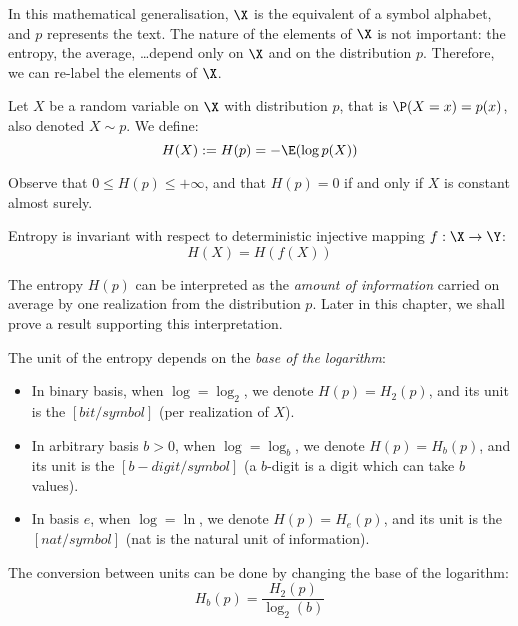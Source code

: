 \documentclass[toc]{../cs-classes/cs-classes}
\begin{document}
\begin{remark}
    In this mathematical generalisation, $\X$ is the equivalent of a symbol alphabet, and $p$ represents the text. The nature of the elements of $\X$ is not important: the entropy, the average, \dots depend only on $\X$ and on the distribution $p$. Therefore, we can re-label the elements of $\X$.
\end{remark}

\begin{definition}
    Let $X$ be a random variable on $\X$ with distribution $p$, that is $\P(X=x) = p(x)$, also denoted $X \sim p$. We define:
    \begin{equation}
        H(X) := H(p) = -\E(\log p(X))
    \end{equation}
\end{definition}

Observe that $0\leq H(p) \leq +\infty$, and that $H(p)=0$ if and only if $X$ is constant almost surely.

\begin{property}
    Entropy is invariant with respect to deterministic injective mapping $f: \X \to \Y$:
    \begin{equation*}
        H(X) = H(f(X))
    \end{equation*}
\end{property}

The entropy $H(p)$ can be interpreted as the \emph{amount of information} carried on average by one realization from the distribution $p$. Later in this chapter, we shall prove a result supporting this interpretation. 

\begin{definition} The unit of the entropy depends on the \emph{base of the logarithm}:
    \begin{itemize}
        \item In binary basis, when $\log = \log_2$, we denote $H(p)=H_2(p)$, and its unit is the $[bit/symbol]$ (per realization of $X$).
        \item In arbitrary basis $b>0$, when $\log = \log_b$, we denote $H(p)=H_b(p)$, and its unit is the $[b-digit/symbol]$ (a $b$-digit is a digit which can take $b$ values).
        \item In basis $e$, when $\log = \ln$, we denote $H(p)=H_e(p)$, and its unit is the $[nat/symbol]$ (nat is the natural unit of information).
    \end{itemize}
    
    The conversion between units can be done by changing the base of the logarithm:
    \begin{equation*}
        H_b(p) = \frac{H_2(p)}{\log_2(b)}
    \end{equation*}
\end{definition}
\end{document}
